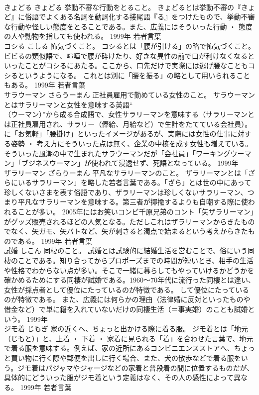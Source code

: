 \documentclass[8pt]{extreport}
\begin{document}
\begin{CJK}{UTF8}{min}
\\	きょどる	きょどる	挙動不審な行動をとること。	きょどるとは挙動不審の『きょど』に俗語でよくある名詞を動詞化する接尾語『る』をつけたもので、挙動不審な行動や怪しい態度をとることである。また、広義にはそういった行動 ・ 態度の人や動物を指しても使われる。	1999年	若者言葉	
\\	コシる	こしる	怖気づくこと。	コシるとは「腰が引ける」の略で怖気づくこと。ビビるの類似語で、喧嘩で腰が砕けたり、好きな異性の前で口が利けなくなるといったことがコシるにあたる。ここから、口先だけで実際には逃げ腰なこともコシるというようになる。 これとは別に「腰を振る」の略として用いられることもある。	1999年	若者言葉	
\\	サラウーマン	さらうーまん	正社員雇用で勤めている女性のこと。	サラウーマンとはサラリーマンと女性を意味する英語“
\\	（ウーマン）”から成る合成語で、女性サラリーマンを意味する（サラリーマンとは正社員雇用され、サラリー（俸給、月給など）で生計をたてている会社員）。
\\	に「お気軽」「腰掛け」といったイメージがあるが、実際には女性の仕事に対する姿勢 ・ 考え方にそういった点は無く、企業の中核を成す女性も増えている。そういった風潮の中で生まれたサラウーマンだが「会社員」「ワーキングウーマン」「ブジネスウーマン」が使われて浸透せず、死語となっている。	1999年	
\\	ザラリーマン	ざらりーまん	平凡なサラリーマンのこと。	ザラリーマンとは「ざらにいるサラリーマン」を略した若者言葉である。「ざら」とは世の中にあって珍しくないさまを表す俗語であり、ザラリーマンは珍しくないサラリーマン、つまり平凡なサラリーマンを意味する。第三者が揶揄するよりも自嘲する際に使われることが多い。 2005年にはお笑いコンビ千原兄弟のコント「矢ザラリーマン」がグッズ販売されるほどの人気となる。ただしこれはザラリーマンからきたものでなく、矢ガモ、矢バトなど、矢が刺さると濁点で始まるという考えからきたものである。	1999年	若者言葉	
\\	試婚	しこん	同棲のこと。	試婚とは試験的に結婚生活を営むことで、俗にいう同棲のことである。知り合ってからプロポーズまでの時間が短いとき、相手の生活や性格でわからない点が多い。そこで一緒に暮らしてもやっていけるかどうかを確かめるためにする同棲が試婚である。1960～70年代に流行った同棲とは違い、女性が採点者として優位にたっているのが特徴である。 して優位にたっているのが特徴である。 また、広義には何らかの理由（法律婚に反対といったものや借金など）で単に籍を入れていないだけの同棲生活（＝事実婚）のことも試婚という。	1999年	
\\	ジモ着	じもぎ	家の近くへ、ちょっと出かける際に着る服。	ジモ着とは「地元（じもと）」と、上着 ・ 下着 ・ 家着に見られる「着」を合わせた言葉で、地元で着る服を意味する。例えば、家の近所にあるコンビニエンスストアへ、ちょっと買い物に行く際や郵便を出しに行く場合、また、犬の散歩などで着る服をいう。ジモ着はパジャマやジャージなどの家着と普段着の間に位置するものだが、具体的にどういった服がジモ着という定義はなく、その人の感性によって異なる。	1999年	若者言葉	

\end{CJK}
\end{document}

